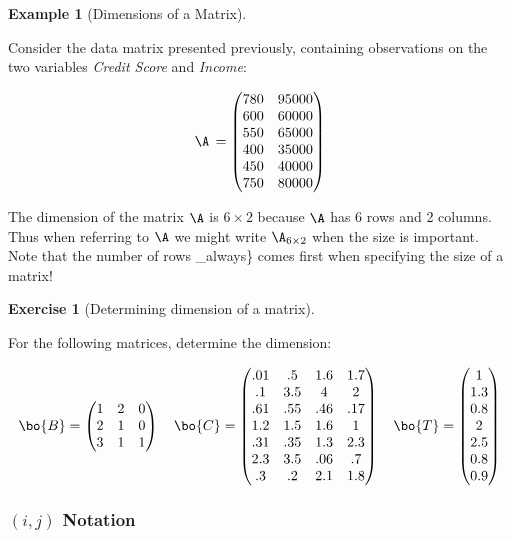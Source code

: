 \documentclass[
]{article}
\theoremstyle{definition}
\theoremstyle{definition}
\newtheorem{example}{Example}[section]
\theoremstyle{definition}
\newtheorem{exercise}{Exercise}[section]
\theoremstyle{definition}
\theoremstyle{remark}
\begin{document}
\begin{example}[Dimensions of a Matrix]
\protect\hypertarget{exm:dimensions}{}\label{exm:dimensions}

Consider the data matrix presented previously, containing observations on the two variables \emph{Credit Score} and \emph{Income}:

\[
\A\,=\left(\begin{matrix}
780 & 95000\cr
600 & 60000\cr
550 & 65000\cr
400 & 35000\cr
450 & 40000\cr
750 & 80000\end{matrix}\right)
\]

The dimension of the matrix \(\A\) is \(6\times 2\) because \(\A\) has 6 rows and 2 columns. Thus when referring to \(\A\) we might write \(\A_{6\times 2}\) when the size is important. Note that the number of rows \_always\} comes first when specifying the size of a matrix!

\end{example}

\begin{exercise}[Determining dimension of a matrix]
\protect\hypertarget{exr:dimensions}{}\label{exr:dimensions}

For the following matrices, determine the dimension:

\[\bo{B} = \left( \begin{matrix}1 & 2 & 0 \cr 2&1&0\cr3&1&1 \end{matrix}\right) \quad \bo{C} = \left(\begin{matrix} .01&.5&1.6&1.7\\ .1&3.5&4&2\\.61&.55&.46&.17\cr1.2&1.5&1.6&1\cr.31&.35&1.3&2.3\\2.3&3.5&.06&.7\\.3&.2&2.1&1.8\end{matrix}\right) \quad \bo{T} = \left(\begin{matrix} 1\cr1.3\cr0.8\cr2\cr2.5\cr0.8\cr0.9 \end{matrix} \right)\]
\vspace{1cm}

\end{exercise}

\hypertarget{ij-notation}{%
\subsubsection{\texorpdfstring{\((i,j)\) Notation}{(i,j) Notation}}\label{ij-notation}}
\end{document}
